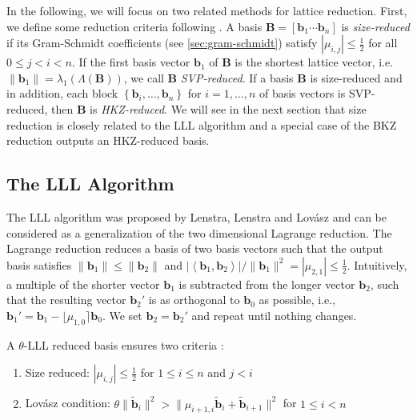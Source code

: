 

In the following, we will focus on two related methods for lattice reduction. %
First, we define some reduction criteria following \cite{ABLR21}. %
A basis $\mathbf{B} = \left[\mathbf{b}_1 \cdots \mathbf{b}_n\right]$ is \textit{size-reduced} if its Gram-Schmidt coefficients (see \cref{sec:gram-schmidt}) satisfy $|\mu_{i,j}| \leq \frac{1}{2}$ for all $0\leq j < i < n$. If the first basis vector $\mathbf{b}_1$ of $\mathbf{B}$ is the shortest lattice vector, i.e. $\|\mathbf{b}_1\| = \lambda_1(\Lambda(\mathbf{B}))$, we call $\mathbf{B}$ \textit{SVP-reduced}. If a basis $\mathbf{B}$ is size-reduced and in addition, each block $\left\{\mathbf{b}_i, \dots, \mathbf{b}_n\right\}$ for $i=1, \dots, n$ of basis vectors is SVP-reduced, then $\mathbf{B}$ is \textit{HKZ-reduced}. We will see in the next section that size reduction is closely related to the LLL algorithm and a special case of the BKZ reduction outputs an HKZ-reduced basis.

\subsection{The LLL Algorithm}
The LLL algorithm was proposed by Lenstra, Lenstra and Lovász \cite{LLL82} and can be considered as a generalization of the two dimensional Lagrange reduction. The Lagrange reduction reduces a basis of two basis vectors such that the output basis satisfies $\|\mathbf{b}_1\| \leq \|\mathbf{b}_2\|$ and $|\left\langle\mathbf{b}_1, \mathbf{b}_2\right\rangle| / \|\mathbf{b}_1\|^2 = |\mu_{2,1}| \leq \frac{1}{2}$. Intuitively, a multiple of the shorter vector $\mathbf{b}_1$ is subtracted from the longer vector $\mathbf{b}_2$, such that the resulting vector $\mathbf{b}_2'$ is as orthogonal to $\mathbf{b}_0$ as possible, i.e.,  $\mathbf{b}_1' =  \mathbf{b}_1 - \lfloor\mu_{1,0}\rceil \mathbf{b}_0$. We set $\mathbf{b}_2 = \mathbf{b}_2'$ and repeat until nothing changes.

A $\theta$-LLL reduced basis ensures two criteria \cite{LLL82}:
\begin{enumerate}
  \item Size reduced: $|\mu_{i,j}| \leq \frac{1}{2}$ for $1\leq i \leq n$ and $j < i$ \label{size-red}
  \item Lovász condition: $\theta \| \tilde{\mathbf{b}}_i \|^2 > \| \mu_{i+1, i} \tilde{\mathbf{b}}_i + \tilde{\mathbf{b}}_{i+1} \|^2$ for $1\leq i < n$
\end{enumerate}

